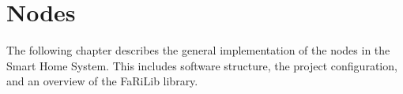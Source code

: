 \chapter{Nodes} \label{sec:nodes}
The following chapter describes the general implementation of the nodes in the 
Smart Home System. This includes software structure, the project configuration,
and an overview of the FaRiLib library.








    
